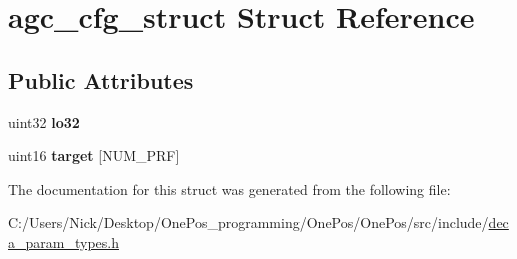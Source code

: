 \hypertarget{structagc__cfg__struct}{\section{agc\-\_\-cfg\-\_\-struct Struct Reference}
\label{structagc__cfg__struct}
}
\subsection*{Public Attributes}
\begin{DoxyCompactItemize}
\item 
\hypertarget{structagc__cfg__struct_ae2f3b1b05d9c8bd16c5d41e73a20cae4}{uint32 {\bfseries lo32}}\label{structagc__cfg__struct_ae2f3b1b05d9c8bd16c5d41e73a20cae4}

\item 
\hypertarget{structagc__cfg__struct_a82950cee70a7988864d9ba0f7575997b}{uint16 {\bfseries target} \mbox{[}N\-U\-M\-\_\-\-P\-R\-F\mbox{]}}\label{structagc__cfg__struct_a82950cee70a7988864d9ba0f7575997b}

\end{DoxyCompactItemize}


The documentation for this struct was generated from the following file\-:\begin{DoxyCompactItemize}
\item 
C\-:/\-Users/\-Nick/\-Desktop/\-One\-Pos\-\_\-programming/\-One\-Pos/\-One\-Pos/src/include/\hyperlink{deca__param__types_8h}{deca\-\_\-param\-\_\-types.\-h}\end{DoxyCompactItemize}
